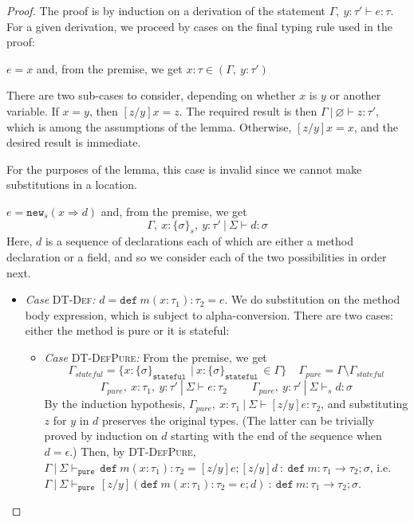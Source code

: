 \documentclass{llncs}
\newcommand{\keywadj}[1]{\mathtt{#1}}
\newcommand{\keyw}[1]{\keywadj{#1}~}
\newcommand{\pcase}[1][]{
  \if\relax\detokenize{#1}\relax
    \def\thiscase{}
  \else
    \def\thiscase{~#1}
  \fi
  \item
}
\begin{document}
\begin{proof} The proof is by induction on a derivation of the statement $\Gamma,~y : \tau' \vdash e : \tau$. For a given derivation, we proceed by cases on the final typing rule used in the proof:

\begin{pcases}
\pcase[\textsc{T-Var}]
$e = x$ and, from the premise, we get $x : \tau \in (\Gamma,~y : \tau')$

There are two sub-cases to consider, depending on whether $x$ is $y$ or another variable. If $x = y$, then $[z/y]x = z$. The required result is then $\Gamma~|~\varnothing \vdash z : \tau'$, which is among the assumptions of the lemma. Otherwise, $[z/y]x = x$, and the desired result is immediate.
\\
\pcase[\textsc{T-Loc}] For the purposes of the lemma, this case is invalid since we cannot make substitutions in a location.
\\
\pcase[\textsc{T-New}]
$e = \keywadj{new}_{s}(x \Rightarrow d)$ and, from the premise, we get
\[
\Gamma,~x : \{ \sigma \}_{s},~y : \tau'~|~\Sigma \vdash d : \sigma
\]
Here, $d$ is a sequence of declarations each of which are either a method declaration or a field, and so we consider each of the two possibilities in order next.
\\
\begin{itemize}
\item[] \textit{Case} \textsc{DT-Def}\textit{:} $d = \keyw{def} m(x : \tau_1) : \tau_2 = e$. We do substitution on the method body expression, which is subject to alpha-conversion. There are two cases: either the method is pure or it is stateful:
\\
\begin{itemize}
\item[] \textit{Case} \textsc{DT-DefPure}\textit{:} From the premise, we get
\[
\Gamma_{stateful} = \{x : \{ \sigma \}_{\keyw{stateful}} ~|~ x : \{ \sigma \}_{\keyw{stateful}} \in \Gamma\}~~~~~\Gamma_{pure} = \Gamma \setminus \Gamma_{stateful}
\]\[
\Gamma_{pure},~x : \tau_1,~y : \tau'~|~\Sigma \vdash e : \tau_2~~~~~~~~~~\Gamma_{pure},~y : \tau'~|~\Sigma \vdash_s d : \sigma
\]
By the induction hypothesis, $\Gamma_{pure},~x : \tau_1~|~\Sigma \vdash [z/y]e : \tau_2$, and substituting $z$ for $y$ in $d$ preserves the original types. (The latter can be trivially proved by induction on $d$ starting with the end of the sequence when $d = \epsilon$.) Then, by \textsc{DT-DefPure}, $\Gamma~|~\Sigma \vdash_{\keyw{pure}} \keyw{def} m(x : \tau_1) : \tau_2 = [z/y]e; [z/y]d~:~\keyw{def} m : \tau_1 \rightarrow \tau_2; \sigma$, i.e. $\Gamma~|~\Sigma \vdash_{\keyw{pure}} [z/y](\keyw{def} m(x : \tau_1) : \tau_2 = e; d)~:~\keyw{def} m : \tau_1 \rightarrow \tau_2; \sigma$.

\end{itemize}
\end{itemize}
\end{pcases}
\end{proof}
\end{document}
